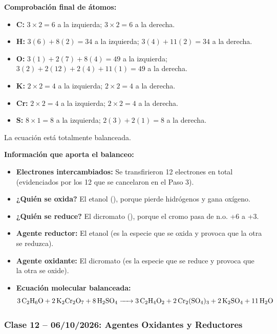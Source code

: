 \textbf{Comprobación final de átomos:}
\begin{itemize}
    \item \textbf{C:} $3 \times 2 = 6$ a la izquierda; $3 \times 2 = 6$ a la derecha.
    \item \textbf{H:} $3(6) + 8(2) = 34$ a la izquierda; $3(4) + 11(2) = 34$ a la derecha.
    \item \textbf{O:} $3(1) + 2(7) + 8(4) = 49$ a la izquierda; $3(2) + 2(12) + 2(4) + 11(1) = 49$ a la derecha.
    \item \textbf{K:} $2 \times 2 = 4$ a la izquierda; $2 \times 2 = 4$ a la derecha.
    \item \textbf{Cr:} $2 \times 2 = 4$ a la izquierda; $2 \times 2 = 4$ a la derecha.
    \item \textbf{S:} $8 \times 1 = 8$ a la izquierda; $2(3) + 2(1) = 8$ a la derecha.
\end{itemize}
La ecuación está totalmente balanceada.

\vspace{0.5cm}

\textbf{Información que aporta el balanceo:}
\begin{itemize}
    \item \textbf{Electrones intercambiados:} Se transfirieron 12 electrones en total (evidenciados por los 12 \ce{[H]} que se cancelaron en el Paso 3).
    \item \textbf{¿Quién se oxida?} El etanol (), porque pierde hidrógenos y gana oxígeno.
    \item \textbf{¿Quién se reduce?} El dicromato (), porque el cromo pasa de n.o. +6 a +3.
    \item \textbf{Agente reductor:} El etanol (es la especie que se oxida y provoca que la otra se reduzca).
    \item \textbf{Agente oxidante:} El dicromato (es la especie que se reduce y provoca que la otra se oxide).
    \item \textbf{Ecuación molecular balanceada:} 
    \[
    \ce{3C2H6O + 2K2Cr2O7 + 8H2SO4 -> 3C2H4O2 + 2Cr2(SO4)3 + 2K2SO4 + 11H2O}
    \]
\end{itemize}

{}
\subsubsection*{\textcolor{blueunam}{Clase 12 -- 06/10/2026: Agentes Oxidantes y Reductores}}

